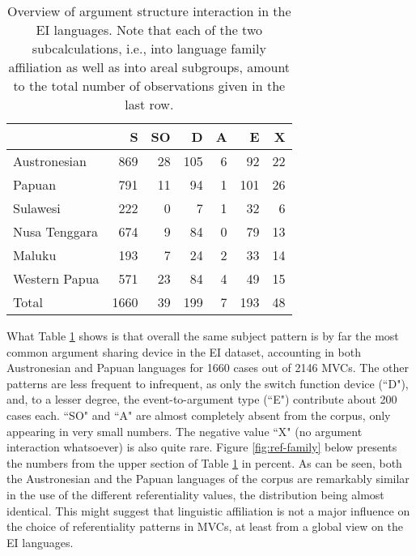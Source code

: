 \begin{table}


\begin{tabular}{lrrrrrr}
  \hline\hline
 & S & SO & D & A & E & X \tabularnewline 
  \hline
Austronesian & 869 &  28 & 105 &   6 &  92 &  22 \tabularnewline
  Papuan & 791 &  11 & 94 &   1 &  101 &  26 \tabularnewline
  \hline
  Sulawesi & 222 &   0 &  7 &   1 &  32 &   6 \tabularnewline
  Nusa Tenggara & 674 &  9 &  84 &   0 &  79 &  13 \tabularnewline 
  Maluku & 193 &   7 &  24 &   2 &   33 &  14 \tabularnewline
  Western Papua & 571 &  23 & 84 &   4 &  49 &  15 \tabularnewline 
 \hline\hline
 Total & 1660  & 39 & 199 &  7 & 193 &  48 \tabularnewline
   \hline
\end{tabular}
\caption[Argument structure interaction in the EI corpus]{Overview of argument structure interaction in the EI languages. Note that each of the two subcalculations, i.e., into language family affiliation as well as into areal subgroups, amount to the total number of observations given in the last row.}
\label{table:Referentiality_overview}


\end{table}


What Table \ref{table:Referentiality_overview} shows is that overall the same subject pattern is by far the most common argument sharing device in the EI dataset, accounting in both Austronesian and Papuan languages for 1660 cases out of 2146 MVCs. The other patterns are less frequent to infrequent, as only the switch function device (``D"), and, to a lesser degree, the event-to-argument type (``E") contribute about 200 cases each. ``SO" and ``A" are almost completely absent from the corpus, only appearing in very small numbers. The negative value ``X" (no argument interaction whatsoever) is also quite rare. Figure \ref{fig:ref-family} below presents the numbers from the upper section of Table \ref{table:Referentiality_overview} in percent. As can be seen, both the Austronesian and the Papuan languages of the corpus are remarkably similar in the use of the different referentiality values, the distribution being almost identical. This might suggest that linguistic affiliation is not a major influence on the choice of referentiality patterns in MVCs, at least from a global view on the EI languages.

